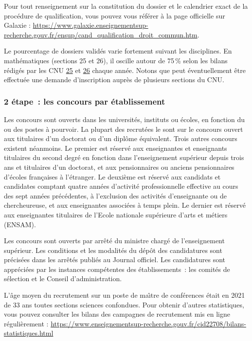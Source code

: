 Pour tout renseignement sur la constitution du dossier et le calendrier exact de la proc\'edure de qualification, 
vous pouvez vous r\'ef\'erer \`a la page officielle sur Galaxie : \url{https://www.galaxie.enseignementsup-recherche.gouv.fr/ensup/cand_qualification_droit_commun.htm}.

Le pourcentage de dossiers valid\'es
varie fortement suivant les disciplines. En math\'ematiques
(sections 25 et 26), il oscille autour de 75\,\% selon les bilans r\'edig\'es par les CNU 
\href{http://cnu25.emath.fr/}{25} et \href{http://cnu26.emath.fr/}{26} chaque ann\'ee. Notons que peut
\'eventuellement \^etre effectu\'ee
une demande d'inscription aupr\`es de plusieurs sections du CNU.

\subsubsection*{2\ieme{} \'etape~: les concours par \'etablissement}

Les concours sont ouverts dans les universit\'es, instituts ou
\'ecoles, en fonction du ou des postes \`a pourvoir. La plupart des
recrut\'e\mp e\mp s le sont sur le concours ouvert aux titulaires d'un
doctorat ou d'un dipl\^ome \'equivalent. Trois autres concours
existent n\'eanmoins. Le premier est r\'eserv\'e aux enseignantes et enseignants
titulaires du second degr\'e en fonction dans l'enseignement
sup\'erieur depuis trois ans et titulaires d'un doctorat, et aux
pensionnaires ou anciens pensionnaires d'\'ecoles fran\c{c}aises \`a
l'\'etranger. Le deuxi\`eme est r\'eserv\'e aux candidats et candidates comptant
quatre ann\'ees d'activit\'e professionnelle effective au cours des
sept ann\'ees pr\'ec\'edentes, \`a l'exclusion des activit\'es
d'enseignant\mp e ou de chercheur\mp euse, et aux enseignant\mp e\mp s associ\'e\mp e\mp s \`a
temps plein.
Le dernier est r\'eserv\'e aux enseignant\mp e\mp s titulaires de l'Ecole nationale sup\'erieure d'arts et m\'etiers (ENSAM).

Les concours sont ouverts par arr\^et\'e du ministre charg\'e de
l'enseignement sup\'erieur. Les conditions et les modalit\'es du
d\'ep\^ot des candidatures sont pr\'ecis\'ees dans les arr\^et\'es
publi\'es au Journal officiel. Les candidatures sont
appr\'eci\'ees par les instances comp\'etentes des
\'etablissements~:
les comit\'es de s\'election et le Conseil d'administration.

L'\^age moyen du recrutement sur un poste de ma\^\i  tre de
conf\'erences \'etait en 2021 de 33 ans toutes sections sciences confondues. Pour obtenir d'autres statistiques, vous pouvez consulter les bilans des campagnes de recrutement mis en ligne r\'e\-gu\-li\`erement :
{\url{https://www.enseignementsup-recherche.gouv.fr/cid22708/bilans-statistiques.html}}

